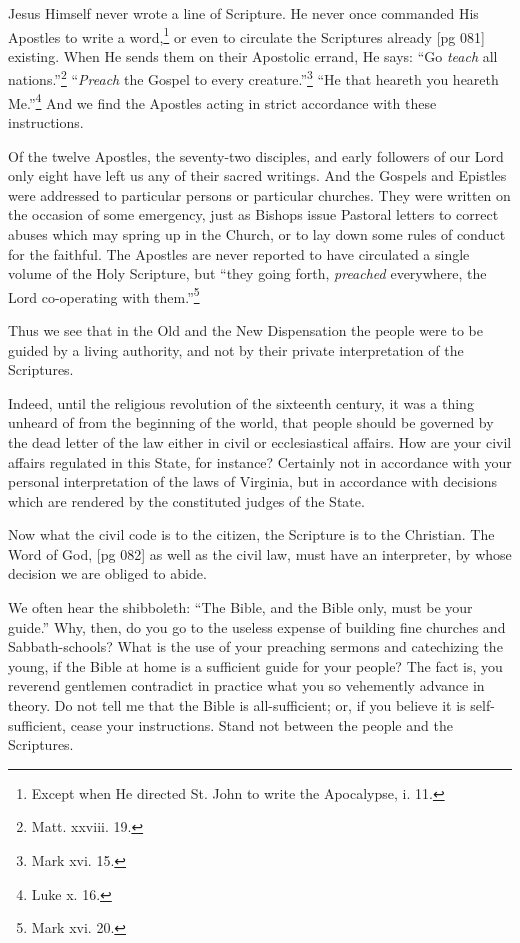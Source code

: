 Jesus Himself never wrote a line of Scripture.
He never once commanded His Apostles to write
a word,\footnote{Except when He directed St. John to write the
Apocalypse, i. 11.} or even to circulate the Scriptures already
[pg 081]
existing. When He sends them on their
Apostolic errand, He says: “Go \emph{teach} all
nations.”\footnote{Matt. xxviii. 19.}
“\emph{Preach} the Gospel to every creature.”\footnote{Mark
xvi. 15.}
“He that heareth you heareth Me.”\footnote{Luke x. 16.}
And we find the Apostles acting in strict accordance
with these instructions.

Of the twelve Apostles, the seventy-two disciples,
and early followers of our Lord only eight
have left us any of their sacred writings. And the
Gospels and Epistles were addressed to particular
persons or particular churches. They were written
on the occasion of some emergency, just as
Bishops issue Pastoral letters to correct abuses
which may spring up in the Church, or to lay
down some rules of conduct for the faithful. The
Apostles are never reported to have circulated a
single volume of the Holy Scripture, but “they
going forth, \emph{preached} everywhere, the Lord co-operating
with them.”\footnote{Mark xvi. 20.}

Thus we see that in the Old and the New Dispensation
the people were to be guided by a living
authority, and not by their private interpretation
of the Scriptures.

Indeed, until the religious revolution of the
sixteenth century, it was a thing unheard of from
the beginning of the world, that people should be
governed by the dead letter of the law either in
civil or ecclesiastical affairs. How are your civil
affairs regulated in this State, for instance? Certainly
not in accordance with your personal interpretation
of the laws of Virginia, but in accordance
with decisions which are rendered by
the constituted judges of the State.

Now what the civil code is to the citizen, the
Scripture is to the Christian. The Word of God,
[pg 082]
as well as the civil law, must have an interpreter,
by whose decision we are obliged to abide.

We often hear the shibboleth: “The Bible, and
the Bible only, must be your guide.” Why, then,
do you go to the useless expense of building fine
churches and Sabbath-schools? What is the use
of your preaching sermons and catechizing the
young, if the Bible at home is a sufficient guide
for your people? The fact is, you reverend gentlemen
contradict in practice what you so vehemently
advance in theory. Do not tell me that the
Bible is all-sufficient; or, if you believe it is self-sufficient,
cease your instructions. Stand not between
the people and the Scriptures.

